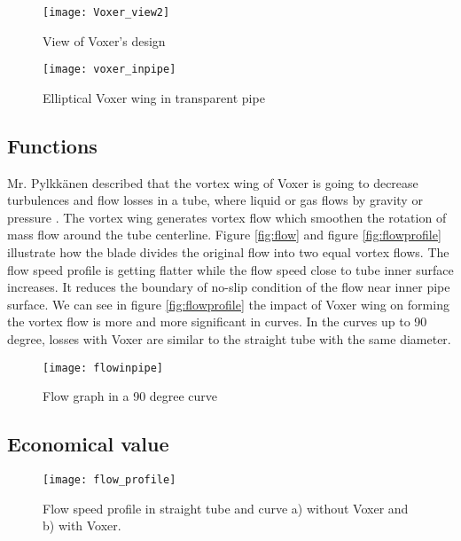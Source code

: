 \begin{figure}[h]
  \centering
  \texttt{[image: Voxer\_view2]}
  \caption{ View of Voxer's design \cite{voxer:article}}
  \label{fig:voxer2}
\end{figure}

\begin{figure}[h]
  \centering
  \texttt{[image: voxer\_inpipe]}
  \caption{ Elliptical Voxer wing in transparent pipe}
  \label{fig:voxerpipe}
\end{figure}
\subsection{Functions}
Mr. Pylkkänen described that the vortex wing of Voxer is going to decrease turbulences and flow losses in a tube, where liquid or gas flows by gravity or pressure \cite{voxer:article}. The vortex wing generates vortex flow which smoothen the rotation of mass flow around the tube centerline. Figure \vref{fig:flow} and figure \vref{fig:flowprofile} illustrate how the blade divides the original flow into two equal vortex flows. The flow speed profile is getting flatter while the flow speed close to tube inner surface increases. It reduces the boundary of no-slip condition of the flow near inner pipe surface. We can see in figure \vref{fig:flowprofile} the impact of Voxer wing on forming the vortex flow is more and more significant in curves. In the curves up to 90 degree, losses with Voxer are similar to the straight tube with the same diameter. 
\begin{figure}[h]
  \centering
  \texttt{[image: flowinpipe]}
  \caption{ Flow graph in a 90 degree curve\cite{voxer:article}}
  \label{fig:flow}
\end{figure}
\subsection{Economical value}
\begin{figure}[h]
  \centering
  \texttt{[image: flow\_profile]}
  \caption{ Flow speed profile in straight tube and curve \newline a) without Voxer and b) with Voxer. \cite{voxer:article}}
  \label{fig:flowprofile}
\end{figure}

